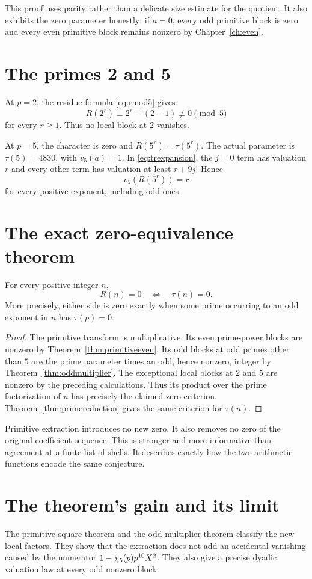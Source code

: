 This proof uses parity rather than a delicate size estimate for the quotient. It also exhibits the zero parameter honestly: if $a=0$, every odd primitive block is zero and every even primitive block remains nonzero by Chapter~\ref{ch:even}.

\section{The primes 2 and 5}
At $p=2$, the residue formula \eqref{eq:rmod5} gives
\[
R(2^r)\equiv2^{r-1}(2-1)\not\equiv0\pmod5
\]
for every $r\ge1$. Thus no local block at $2$ vanishes.

At $p=5$, the character is zero and $R(5^r)=\tau(5^r)$. The actual parameter is $\tau(5)=4830$, with $v_5(a)=1$. In \eqref{eq:trexpansion}, the $j=0$ term has valuation $r$ and every other term has valuation at least $r+9j$. Hence
\[
v_5(R(5^r))=r
\]
for every positive exponent, including odd ones.

\section{The exact zero-equivalence theorem}
\begin{theorem}\label{thm:zeroequivalence}
For every positive integer $n$,
\[
R(n)=0\quad\Longleftrightarrow\quad\tau(n)=0.
\]
More precisely, either side is zero exactly when some prime occurring to an odd exponent in $n$ has $\tau(p)=0$.
\end{theorem}
\begin{proof}
The primitive transform is multiplicative. Its even prime-power blocks are nonzero by Theorem~\ref{thm:primitiveeven}. Its odd blocks at odd primes other than $5$ are the prime parameter times an odd, hence nonzero, integer by Theorem~\ref{thm:oddmultiplier}. The exceptional local blocks at $2$ and $5$ are nonzero by the preceding calculations. Thus its product over the prime factorization of $n$ has precisely the claimed zero criterion. Theorem~\ref{thm:primereduction} gives the same criterion for $\tau(n)$.
\end{proof}

Primitive extraction introduces no new zero. It also removes no zero of the original coefficient sequence. This is stronger and more informative than agreement at a finite list of shells. It describes exactly how the two arithmetic functions encode the same conjecture.

\section{The theorem's gain and its limit}
The primitive square theorem and the odd multiplier theorem classify the new local factors. They show that the extraction does not add an accidental vanishing caused by the numerator $1-\chi_5(p)p^{10}X^2$. They also give a precise dyadic valuation law at every odd nonzero block.

